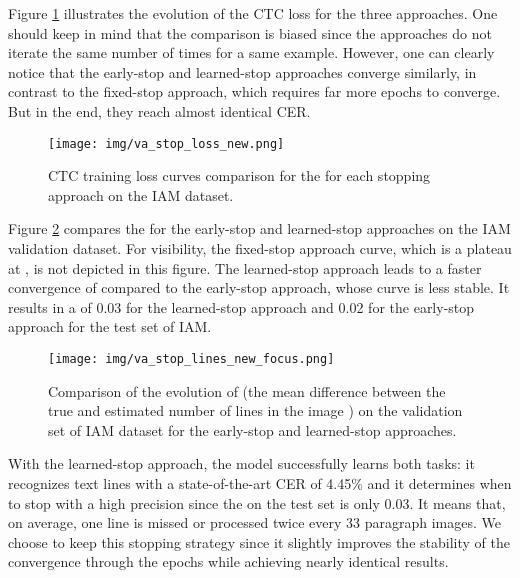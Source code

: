 Figure \ref{fig:loss-stop} illustrates the evolution of the CTC loss for the three approaches. One should keep in mind that the comparison is biased since the approaches do not iterate the same number of times for a same example. However, one can clearly notice that the early-stop and learned-stop approaches  converge similarly, in contrast to the fixed-stop approach, which requires far more epochs to converge. But in the end, they reach almost identical CER.

\begin{figure}[htbp!]
\centering
\texttt{[image: img/va\_stop\_loss\_new.png]}
        \caption{CTC training loss curves comparison for the \modelacc{} for each stopping approach on the IAM dataset.}
        \label{fig:loss-stop}

\end{figure}


Figure \ref{fig:diff-stop} compares the  for the early-stop and learned-stop approaches on the IAM validation dataset. For visibility, the fixed-stop approach curve, which is a plateau at , is not depicted in this figure. The learned-stop approach leads to a faster convergence of  compared to the early-stop approach, whose curve is less stable. It results in a  of 0.03 for the learned-stop approach and 0.02 for the early-stop approach for the test set of IAM.

\begin{figure}[htbp!]
\centering
\texttt{[image: img/va\_stop\_lines\_new\_focus.png]}
        \caption{Comparison of the evolution of  (the mean difference between the true and estimated number of lines in the image ) on the validation set of IAM dataset for the early-stop and learned-stop approaches.}
        \label{fig:diff-stop}
\end{figure}

With the learned-stop approach, the model successfully learns both tasks: it recognizes text lines with a state-of-the-art CER of 4.45\% and it determines when to stop with a high precision since the  on the test set is only 0.03. It means that, on average, one line is missed or processed twice every 33 paragraph images.
We choose to keep this stopping strategy since it slightly improves the stability of the convergence through the epochs while achieving nearly identical results.

